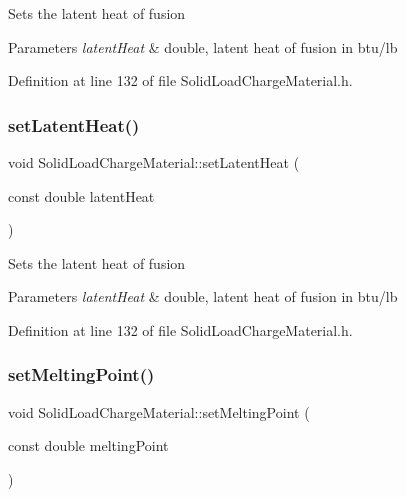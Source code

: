 Sets the latent heat of fusion 
\begin{DoxyParams}{Parameters}
{\em latent\+Heat} & double, latent heat of fusion in btu/lb \\
\hline
\end{DoxyParams}


Definition at line 132 of file Solid\+Load\+Charge\+Material.\+h.

\mbox{\label{class_solid_load_charge_material_ac7361119ab7cc352dfbdc6fcb9175981}} 
\subsubsection{\texorpdfstring{set\+Latent\+Heat()}{setLatentHeat()}\hspace{0.1cm}{\footnotesize\ttfamily [3/3]}}
{\footnotesize\ttfamily void Solid\+Load\+Charge\+Material\+::set\+Latent\+Heat (\begin{DoxyParamCaption}\item[{const double}]{latent\+Heat }\end{DoxyParamCaption})\hspace{0.3cm}{\ttfamily [inline]}}

Sets the latent heat of fusion 
\begin{DoxyParams}{Parameters}
{\em latent\+Heat} & double, latent heat of fusion in btu/lb \\
\hline
\end{DoxyParams}


Definition at line 132 of file Solid\+Load\+Charge\+Material.\+h.

\mbox{\label{class_solid_load_charge_material_a6c235b1c49be98b02829d37af9c38cb2}} 
\subsubsection{\texorpdfstring{set\+Melting\+Point()}{setMeltingPoint()}\hspace{0.1cm}{\footnotesize\ttfamily [1/3]}}
{\footnotesize\ttfamily void Solid\+Load\+Charge\+Material\+::set\+Melting\+Point (\begin{DoxyParamCaption}\item[{const double}]{melting\+Point }\end{DoxyParamCaption})\hspace{0.3cm}{\ttfamily [inline]}}

